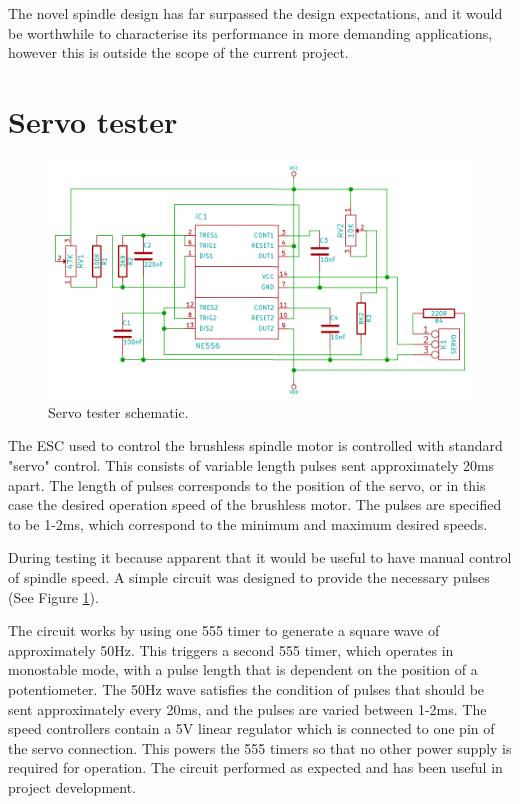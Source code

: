 The novel spindle design has far surpassed the design expectations, and it
would be worthwhile to characterise its performance in more demanding applications,
however this is outside the scope of the current project.


\newpage
\appendix
\appendixpage
\addappheadtotoc
\section{Servo tester}

\begin{figure}[ht!]
\centering
\includegraphics[width=160mm]{resources/servoexerciser.png}
\caption{Servo tester schematic.}
\label{fig:servotesterschem}
\end{figure}

The ESC used to control the brushless spindle motor is controlled with standard "servo" control. This consists of variable length pulses sent approximately 20ms apart.
The length of pulses corresponds to the position of the servo, or in this case the desired operation speed of the brushless motor. The pulses are specified to be 1-2ms,
which correspond to the minimum and maximum desired speeds.

During testing it because apparent that it would be useful to have manual control of spindle speed. A simple circuit was designed to provide the necessary pulses (See Figure \ref{fig:servotesterschem}).

The circuit works by using one 555 timer to generate a square wave of approximately 50Hz. This triggers a second 555 timer, which operates in monostable mode, with a pulse length
that is dependent on the position of a potentiometer. The 50Hz wave satisfies the condition of pulses that should be sent approximately every 20ms, and the pulses are varied between 1-2ms. The speed controllers
contain a 5V linear regulator which is connected to one pin of the servo connection. This powers the 555 timers so that no other power supply is required for operation. The circuit performed as expected and 
has been useful in project development.

